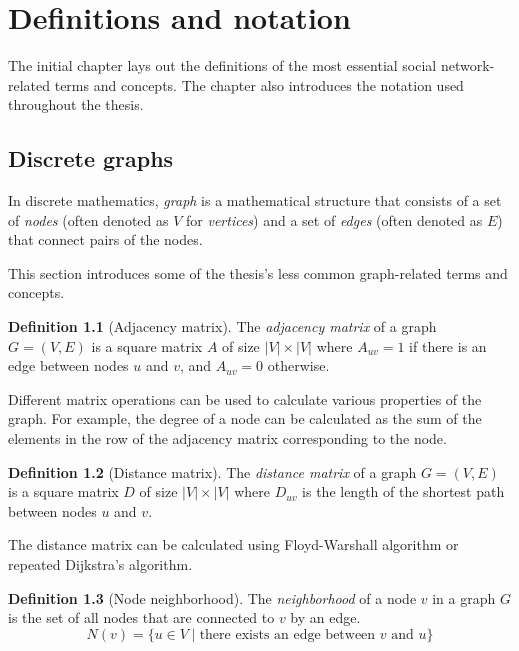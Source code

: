 \chapter{Definitions and notation}

The initial chapter lays out the definitions of the most essential social network-related terms and concepts. 
The chapter also introduces the notation used throughout the thesis.

\section{Discrete graphs}

In discrete mathematics, \textit{graph} is a mathematical structure that consists of a set of \textit{nodes} (often denoted as $V$ for \textit{vertices})
and a set of \textit{edges} (often denoted as $E$) that connect pairs of the nodes.

This section introduces some of the thesis's less common graph-related terms and concepts.

\theoremstyle{definition}
\newtheorem{definition}{Definition}[section]

\begin{definition}[Adjacency matrix]
    The \textit{adjacency matrix} of a graph $G = (V, E)$ is a square matrix $A$ of size $|V| \times |V|$ where $A_{uv} = 1$ if there is an edge between nodes $u$ and $v$, and $A_{uv} = 0$ otherwise.  

    Different matrix operations can be used to calculate various properties of the graph. For example, the degree of a node can be calculated as the sum of the elements in the row of the adjacency matrix corresponding to the node.
\end{definition}

\begin{definition}[Distance matrix]
    The \textit{distance matrix} of a graph $G = (V, E)$ is a square matrix $D$ of size $|V| \times |V|$ where $D_{uv}$ is the length of the shortest path between nodes $u$ and $v$.

    The distance matrix can be calculated using Floyd-Warshall algorithm or repeated Dijkstra's algorithm.
\end{definition}

\begin{definition}[Node neighborhood]
    The \textit{neighborhood} of a node $v$ in a graph $G$ is the set of all nodes that are connected to $v$ by an edge.
    $$
    N(v) = \{ u \in V \mid \text{there exists an edge between $v$ and $u$} \}
    $$
\end{definition}

